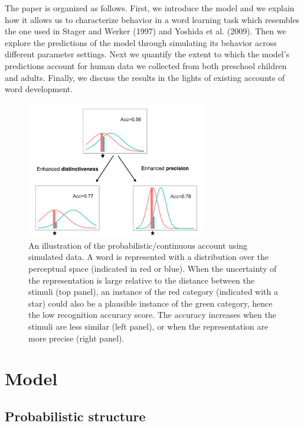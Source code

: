 \documentclass[english,,man,floatsintext]{apa6}
\theoremstyle{definition}
\theoremstyle{definition}
\theoremstyle{definition}
\theoremstyle{remark}
\begin{document}
The paper is organized as follows. First, we introduce the model and we
explain how it allows us to characterize behavior in a word learning
task which resembles the one used in Stager and Werker (1997) and
Yoshida et al. (2009). Then we explore the predictions of the model
through simulating its behavior across different parameter settings.
Next we quantify the extent to which the model's predictions account for
human data we collected from both preschool children and adults.
Finally, we discuss the results in the lights of existing accounts of
word development.

\begin{figure}

{\centering \includegraphics[width=300px]{figs/illustration} 

}

\caption{An illustration of the probabilistic/continuous account using simulated data. A word is represented with a distribution over the perceptual space (indicated in red or blue). When the uncertainty of the representation is large relative to the distance between the stimuli (top panel), an instance of the red category (indicated with a star) could also be a plausible instance of the green category, hence the low recognition accuracy score. The accuracy increases when the stimuli are less similar (left panel), or when the representation are more precise (right panel).}\label{fig:illus}
\end{figure}

\section{Model}\label{model}

\subsection{Probabilistic structure}\label{probabilistic-structure}
\end{document}
